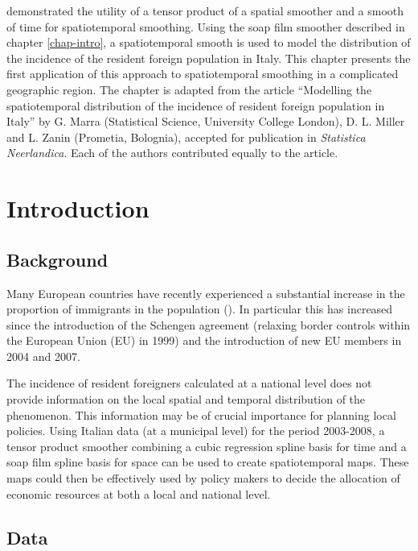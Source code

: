 \label{chap-it}

 demonstrated the utility of a tensor product of a spatial smoother and a smooth of time for spatiotemporal smoothing. Using the soap film smoother described in chapter \ref{chap-intro}, a spatiotemporal smooth is used to model the distribution of the incidence of the resident foreign population in Italy. This chapter presents the first application of this approach to spatiotemporal smoothing in a complicated geographic region. The chapter is adapted from the article ``Modelling the spatiotemporal distribution of the incidence of resident foreign population in Italy'' by G. Marra (Statistical Science, University College London), D. L. Miller and L. Zanin (Prometia, Bolognia), accepted for publication in \textit{Statistica Neerlandica}. Each of the authors contributed equally to the article.

\section{Introduction \label{IN}}

\subsection{Background}

Many European countries have recently experienced a substantial increase in the proportion of immigrants in the population (\cite{Manning2010}). In particular this has increased since the introduction of the Schengen agreement (relaxing border controls within the European Union (EU) in 1999) and the introduction of new EU members in 2004 and 2007. 

The incidence of resident foreigners calculated at a national level does not provide information on the local spatial and temporal distribution of the phenomenon. This information may be of crucial importance for planning local policies. Using Italian data (at a municipal level) for the period 2003-2008, a tensor product smoother combining a cubic regression spline basis for time and a soap film spline basis for space can be used to create spatiotemporal maps. These maps could then be effectively used by policy makers to decide the allocation of economic resources at both a local and national level.

\subsection{Data}  

